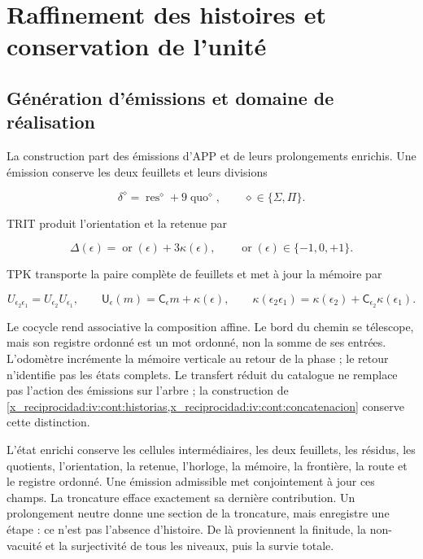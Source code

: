 \chapter{Raffinement des histoires et conservation de l’unité}
\label{x_reciprocidad:nuclear:1}
\section{Génération d’émissions et domaine de réalisation}

La construction part des émissions d’APP et de leurs prolongements enrichis. Une émission conserve les deux feuillets et leurs divisions

\[
\delta^\diamond=\operatorname{res}^\diamond+9\operatorname{quo}^\diamond,
\qquad \diamond\in\{\Sigma,\Pi\}.
\]

TRIT produit l’orientation et la retenue par

\[
\Delta(\epsilon)=\operatorname{or}(\epsilon)+3\kappa(\epsilon),
\qquad \operatorname{or}(\epsilon)\in\{-1,0,+1\}.
\]

TPK transporte la paire complète de feuillets et met à jour la mémoire par

\[
U_{\epsilon_2\epsilon_1}=U_{\epsilon_2}U_{\epsilon_1},\qquad
\mathsf U_\epsilon(m)=\mathsf C_\epsilon m+\kappa(\epsilon),\qquad
\kappa(\epsilon_2\epsilon_1)
=\kappa(\epsilon_2)+\mathsf C_{\epsilon_2}\kappa(\epsilon_1).
\]

Le cocycle rend associative la composition affine. Le bord du chemin se télescope, mais son registre ordonné est un mot ordonné, non la somme de ses entrées. L’odomètre incrémente la mémoire verticale au retour de la phase ; le retour n’identifie pas les états complets. Le transfert réduit du catalogue ne remplace pas l’action des émissions sur l’arbre ; la construction de \cref{x_reciprocidad:iv:cont:historias,x_reciprocidad:iv:cont:concatenacion} conserve cette distinction.

L’état enrichi conserve les cellules intermédiaires, les deux feuillets, les résidus, les quotients, l’orientation, la retenue, l’horloge, la mémoire, la frontière, la route et le registre ordonné. Une émission admissible met conjointement à jour ces champs. La troncature efface exactement sa dernière contribution. Un prolongement neutre donne une section de la troncature, mais enregistre une étape : ce n’est pas l’absence d’histoire. De là proviennent la finitude, la non-vacuité et la surjectivité de tous les niveaux, puis la survie totale.

